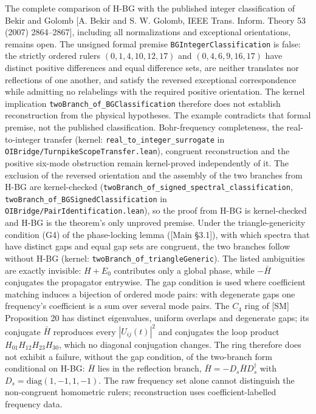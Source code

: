 \documentclass[
]{article}
\begin{document}
The complete comparison of H-BG with the published integer
classification of Bekir and Golomb {[}A. Bekir and S. W. Golomb, IEEE
Trans. Inform. Theory 53 (2007) 2864--2867{]}, including all
normalizations and exceptional orientations, remains open. The unsigned
formal premise \texttt{BGIntegerClassification} is false: the strictly
ordered rulers \((0,1,4,10,12,17)\) and \((0,4,6,9,16,17)\) have
distinct positive differences and equal difference sets, are neither
translates nor reflections of one another, and satisfy the reversed
exceptional correspondence while admitting no relabelings with the
required positive orientation. The kernel implication
\texttt{twoBranch\_of\_BGClassification} therefore does not establish
reconstruction from the physical hypotheses. The example contradicts
that formal premise, not the published classification. Bohr-frequency
completeness, the real-to-integer transfer (kernel:
\texttt{real\_to\_integer\_surrogate} in
\texttt{OIBridge/TurnpikeScopeTransfer.lean}), congruent reconstruction
and the positive six-mode obstruction remain kernel-proved independently
of it. The exclusion of the reversed orientation and the assembly of the
two branches from H-BG are kernel-checked
(\texttt{twoBranch\_of\_signed\_spectral\_classification},
\texttt{twoBranch\_of\_BGSignedClassification} in
\texttt{OIBridge/PairIdentification.lean}), so the proof from H-BG is
kernel-checked and H-BG is the theorem's only unproved premise. Under
the triangle-genericity condition (G4) of the phase-locking lemma
({[}Main §3.1{]}), with which spectra that have distinct gaps and equal
gap sets are congruent, the two branches follow without H-BG (kernel:
\texttt{twoBranch\_of\_triangleGeneric}). The listed ambiguities are
exactly invisible: \(H+E_0\) contributes only a global phase, while
\(-\bar H\) conjugates the propagator entrywise. The gap condition is
used where coefficient matching induces a bijection of ordered mode
pairs: with degenerate gaps one frequency's coefficient is a sum over
several mode pairs. The \(C_4\) ring of {[}SM{]} Proposition 20 has
distinct eigenvalues, uniform overlaps and degenerate gaps; its
conjugate \(\bar H\) reproduces every \(|U_{ij}(t)|^2\) and conjugates
the loop product \(H_{01}H_{12}H_{23}H_{30}\), which no diagonal
conjugation changes. The ring therefore does not exhibit a failure,
without the gap condition, of the two-branch form conditional on H-BG:
\(\bar H\) lies in the reflection branch,
\(\bar H = -D_s\bar H D_s^\dagger\) with
\(D_s = \mathrm{diag}(1,-1,1,-1)\). The raw frequency set alone cannot
distinguish the non-congruent homometric rulers; reconstruction uses
coefficient-labelled frequency data.
\end{document}
